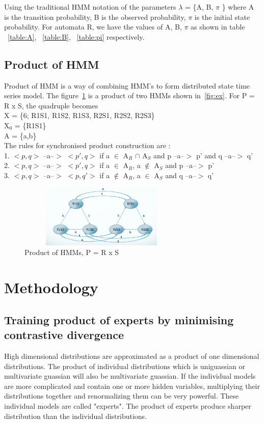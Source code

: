 \documentclass[10pt, conference, compsocconf]{IEEEtran}
\begin{document}
Using the traditional HMM notation of the parameters $\lambda$ = \{A, B, $\pi$ \} where A is the transition probability, B is the observed probability, $\pi$ is the initial state probability. For automata R, we have the values of A, B, $\pi$ as shown in table ~\ref{table:A}, ~\ref{table:B}, ~\ref{table:pi} respectively.

\subsection{Product of HMM}
\label {sec:pohmm}
Product of HMM is a way of combining HMM's to form distributed state time series model. The figure~\ref{fig:pohmm} is a product of two HMMs shown in~\ref{fig:ex}. For  P = R x S, the quadruple becomes\\
X = \{6; R1S1, R1S2, R1S3, R2S1, R2S2, R2S3\} \\
X$_{0}$ = \{R1S1\} \\
A = \{a,b\} \\
The rules for synchronised product construction are : \\
1. $<p,q>$ --a--$>$ $<p',q>$ if a $\in$ A$_{R}$ $\cap$ A$_{S}$ and p --a--$>$ p' and q --a--$>$ q'	\\
2. $<p,q>$ --a--$>$ $<p',q>$ if a $\in$ A$_{R}$, a $\notin$ A$_{S}$ and p --a--$>$ p'	\\
3. $<p,q>$ --a--$>$ $<p,q'>$ if a $\notin$ A$_{R}$, a $\in$ A$_{S}$ and q --a--$>$ q'	\\

\begin{figure}[t]
\centering
\includegraphics[width=8cm,height=3cm]{product.png}
\caption{Product of HMMs, P = R x S}
\label{fig:pohmm}
\end{figure}


\section{ Methodology }
\subsection{Training product of experts by minimising contrastive divergence}
High dimensional distributions are approximated as a product of one dimensional distributions. The product of individual distributions which is uniguassian or multivariate guassian will also be multivariate guassian. If the individual models are more complicated and contain one or more hidden variables, multiplying their distributions together and renormalizing them can be very powerful. These individual models are called "experts".
The product of experts produce sharper distribution than the individual distributions\cite{hinton2000}.
\end{document}
